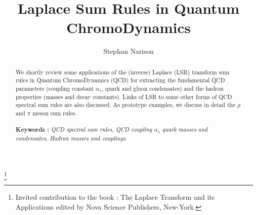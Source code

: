 \documentclass[aps,prd,groupedaddress,nofootinbib]{revtex4-1}
\begin{document}

\title{Laplace Sum Rules in Quantum ChromoDynamics}
\thanks{Invited contribution to the book : The Laplace Transform and its Applications edited by Nova Science Publishers, New-York.}
\author{Stephan Narison%
}




\begin{abstract}
\noindent
We  shortly review some applications of the (inverse) Laplace (LSR) transform sum rules in Quantum ChromoDynamics (QCD) for extracting the fundamental QCD parameters (coupling constant $\alpha_s$, quark and gluon condensates) and the hadron properties (masses and decay constants). Links of LSR to some other forms of QCD spectral sum rules are also discussed. As prototype examples, we discuss in detail the $\rho$ and $\pi$ meson sum rules. \\
\\
{\bf Keywords :} {\it QCD spectral sum rules, QCD coupling $\alpha_s$ quark masses and condensates,  
\hspace*{2.3cm}Hadron masses and couplings.}
\end{abstract}
\maketitle
\end{document}
